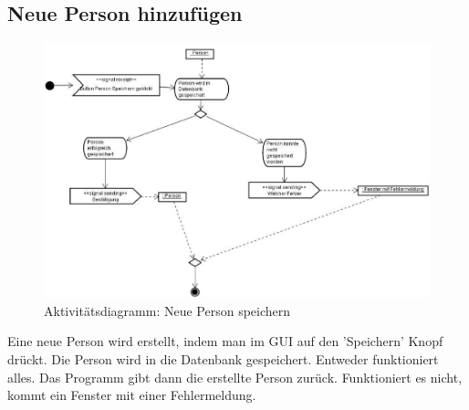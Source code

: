 \subsection{Neue Person hinzufügen}
\begin{figure}[ht]
\begin{center}
\includegraphics[width=15cm]{images/savePersonAkt.png}
\caption{Aktivitätsdiagramm:  Neue Person speichern}
\end{center}
\end{figure}
Eine neue Person wird erstellt, indem man im GUI auf den 'Speichern' Knopf drückt. Die
Person wird in die Datenbank gespeichert. Entweder funktioniert alles. Das Programm gibt
dann die erstellte Person zurück. Funktioniert es nicht, kommt ein Fenster mit einer
Fehlermeldung.
%
\newpage
